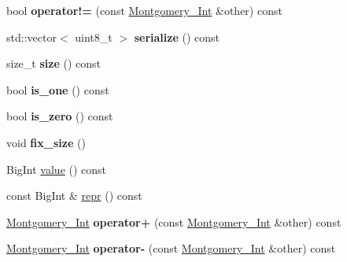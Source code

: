 \begin{DoxyCompactItemize}
bool {\bfseries operator!=} (const \hyperlink{class_botan_1_1_montgomery___int}{Montgomery\+\_\+\+Int} \&other) const
\item 
\mbox{\label{class_botan_1_1_montgomery___int_a90e1d7ea30f53ffb7504345d66e635cc}} 
std\+::vector$<$ uint8\+\_\+t $>$ {\bfseries serialize} () const
\item 
\mbox{\label{class_botan_1_1_montgomery___int_a002611dc606e5d53039cfa226caf2943}} 
size\+\_\+t {\bfseries size} () const
\item 
\mbox{\label{class_botan_1_1_montgomery___int_a200e8ecefbef821238f9d63de1ad9855}} 
bool {\bfseries is\+\_\+one} () const
\item 
\mbox{\label{class_botan_1_1_montgomery___int_aba7ec7ab30218104ab17bc974f7c937a}} 
bool {\bfseries is\+\_\+zero} () const
\item 
\mbox{\label{class_botan_1_1_montgomery___int_adb46d0efcf60137e59fafb14e8ce5b6e}} 
void {\bfseries fix\+\_\+size} ()
\item 
Big\+Int \hyperlink{class_botan_1_1_montgomery___int_abc91331bc32dc00db87e8343f9839709}{value} () const
\item 
const Big\+Int \& \hyperlink{class_botan_1_1_montgomery___int_aad869bdd9eb0dd780774f430169d9af1}{repr} () const
\item 
\mbox{\label{class_botan_1_1_montgomery___int_ab59516fcf6e6d4b2dc029163ab726a8d}} 
\hyperlink{class_botan_1_1_montgomery___int}{Montgomery\+\_\+\+Int} {\bfseries operator+} (const \hyperlink{class_botan_1_1_montgomery___int}{Montgomery\+\_\+\+Int} \&other) const
\item 
\mbox{\label{class_botan_1_1_montgomery___int_aa135402ce9758b98c7296c986dcbe7e2}} 
\hyperlink{class_botan_1_1_montgomery___int}{Montgomery\+\_\+\+Int} {\bfseries operator-\/} (const \hyperlink{class_botan_1_1_montgomery___int}{Montgomery\+\_\+\+Int} \&other) const
\item 
\mbox{\label{class_botan_1_1_montgomery___int_acee06e187c18cadb0040800c0b7c535d}} 

\end{DoxyCompactItemize}
